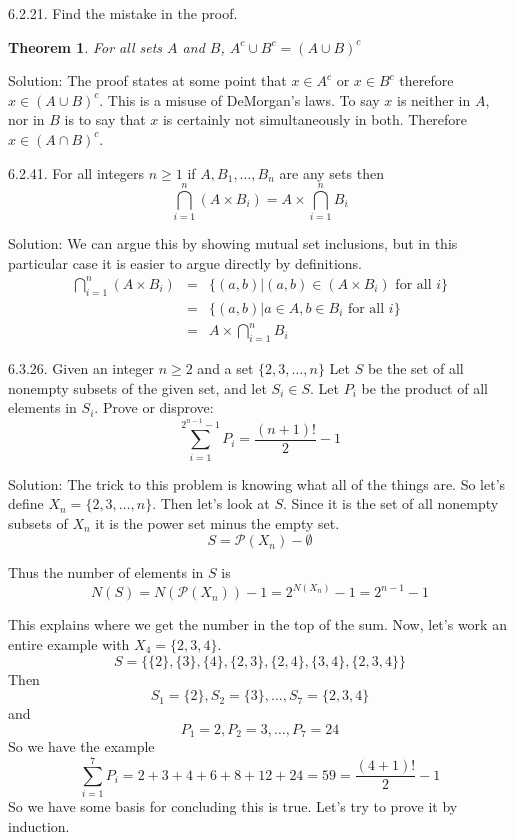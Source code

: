 \documentclass[10 pt]{amsart}
\newtheorem{thm}{Theorem}
\theoremstyle{definition}
\theoremstyle{remark}
\numberwithin{equation}{subsection}
\begin{document}
\newpage

6.2.21. Find the mistake in the proof.\\
\begin{thm}
For all sets $A$ and $B$, $A^c\cup B^c = (A\cup B)^c$
\end{thm}

Solution: The proof states at some point that $x\in A^c$ or $x\in B^c$ therefore $x\in (A\cup B)^c$.  This is a misuse of DeMorgan's laws.  To say $x$ is neither in $A$, nor in $B$ is to say that $x$ is certainly not simultaneously in both.  Therefore $x\in (A\cap B)^c$.

\newpage

6.2.41. For all integers $n\geq 1$ if $A,B_1,\dots, B_n$ are any sets then
\[
\bigcap_{i=1}^{n} (A\times B_i) = A \times \bigcap_{i=1}^{n} B_i
\]

Solution:  We can argue this by showing mutual set inclusions, but in this particular case it is easier to argue directly by definitions.
\begin{eqnarray*}
\bigcap_{i=1}^{n} (A\times B_i) &=& \{(a,b)|(a,b)\in (A\times B_i) \text{ for all } i \}\\
&=& \{(a,b)| a\in A, b\in B_i \text{ for all } i \}\\
&=& A\times \bigcap_{i=1}^n B_i
\end{eqnarray*}


\newpage

6.3.26. Given an integer $n\geq 2$ and a set $\{2,3,\dots,n\}$ Let $S$ be the set of all nonempty subsets of the given set, and let $S_i \in S$.  Let $P_i$ be the product of all elements in $S_i$.  Prove or disprove:
\[
\sum_{i=1}^{2^{n-1}-1} P_i = \frac{(n+1)!}{2} -1
\]


Solution:  The trick to this problem is knowing what all of the things are.  So let's define $X_n = \{2,3,\dots,n\}$.  Then let's look at $S$.  Since it is the set of all nonempty subsets of $X_n$ it is the power set minus the empty set.
\[
S = \mathcal{P}(X_n) - \emptyset
\]

Thus the number of elements in $S$ is
\[
N(S) = N(\mathcal{P}(X_n)) -1 = 2^{N(X_n)}-1 = 2^{n-1}-1
\]

This explains where we get the number in the top of the sum.  Now, let's work an entire example with $X_4=\{2,3,4\}$.
\[
S=\{ \{2\},\{3\},\{4\},\{2,3\},\{2,4\},\{3,4\},\{2,3,4\} \}
\]
Then
\[
S_1 =\{2\},S_2 = \{3\},\dots, S_7 =\{2,3,4\}
\]
and
\[
P_1=2, P_2=3,\dots, P_7 =24
\]
So we have the example
\[
\sum_{i=1}^{7} P_i = 2+3+4+6+8+12+24 = 59 = \frac{(4+1)!}{2}-1
\]
So we have some basis for concluding this is true.  Let's try to prove it by induction.
\end{document}
